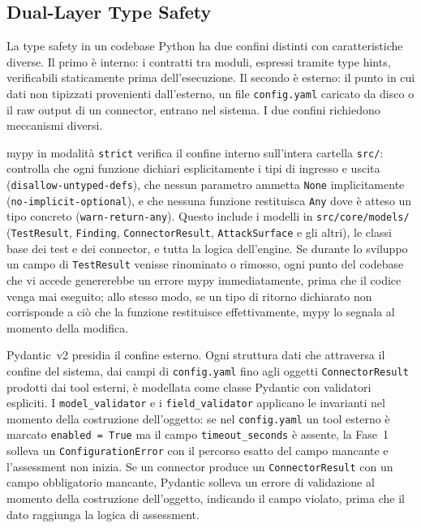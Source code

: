 \subsection{Dual-Layer Type Safety}\label{subsec:dual-layer-type-safety}

La type safety in un codebase Python ha due confini distinti con caratteristiche diverse. Il primo è interno: i contratti tra moduli, espressi tramite type hints, verificabili staticamente prima dell'esecuzione. Il secondo è esterno: il punto in cui dati non tipizzati provenienti dall'esterno, un file \texttt{config.yaml} caricato da disco o il raw output di un connector, entrano nel sistema. I due confini richiedono meccanismi diversi.

mypy in modalità \texttt{strict} verifica il confine interno sull'intera cartella \texttt{src/}: controlla che ogni funzione dichiari esplicitamente i tipi di ingresso e uscita (\texttt{disallow-untyped-defs}), che nessun parametro ammetta \texttt{None} implicitamente (\texttt{no-implicit-optional}), e che nessuna funzione restituisca \texttt{Any} dove è atteso un tipo concreto (\texttt{warn-return-any}). Questo include i modelli in \texttt{src/core/models/} (\texttt{TestResult}, \texttt{Finding}, \texttt{ConnectorResult}, \texttt{AttackSurface} e gli altri), le classi base dei test e dei connector, e tutta la logica dell'engine. Se durante lo sviluppo un campo di \texttt{TestResult} venisse rinominato o rimosso, ogni punto del codebase che vi accede genererebbe un errore mypy immediatamente, prima che il codice venga mai eseguito; allo stesso modo, se un tipo di ritorno dichiarato non corrisponde a ciò che la funzione restituisce effettivamente, mypy lo segnala al momento della modifica.

Pydantic~v2 presidia il confine esterno. Ogni struttura dati che attraversa il confine del sistema, dai campi di \texttt{config.yaml} fino agli oggetti \texttt{ConnectorResult} prodotti dai tool esterni, è modellata come classe Pydantic con validatori espliciti. I \texttt{model\_validator} e i \texttt{field\_validator} applicano le invarianti nel momento della costruzione dell'oggetto: se nel \texttt{config.yaml} un tool esterno è marcato \texttt{enabled~=~True} ma il campo \texttt{timeout\_seconds} è assente, la Fase~1 solleva un \texttt{ConfigurationError} con il percorso esatto del campo mancante e l'assessment non inizia. Se un connector produce un \texttt{ConnectorResult} con un campo obbligatorio mancante, Pydantic solleva un errore di validazione al momento della costruzione dell'oggetto, indicando il campo violato, prima che il dato raggiunga la logica di assessment.


